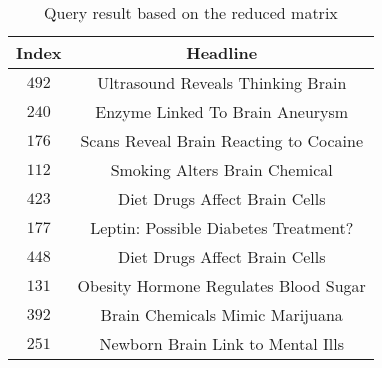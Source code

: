\documentclass[12pt,oneside,a4paper]{article}
\begin{document}
\begin{table}[!p]
\centering
\caption{Query result based on the reduced matrix}
\begin{tabular}{cc}
\toprule
 \multicolumn{1}{c}{ Index } & \multicolumn{1}{c}{ Headline } \\
\midrule
 $492$ & Ultrasound Reveals Thinking Brain \\
 $240$ & Enzyme Linked To Brain Aneurysm \\
 $176$ & Scans Reveal Brain Reacting to Cocaine \\
 $112$ & Smoking Alters Brain Chemical \\
 $423$ & Diet Drugs Affect Brain Cells \\
 $177$ & Leptin: Possible Diabetes Treatment? \\
 $448$ & Diet Drugs Affect Brain Cells \\
 $131$ & Obesity Hormone Regulates Blood Sugar \\
 $392$ & Brain Chemicals Mimic Marijuana \\
 $251$ & Newborn Brain Link to Mental Ills \\
\bottomrule
\end{tabular}
\label{query reduced}
\end{table}
\end{document}
